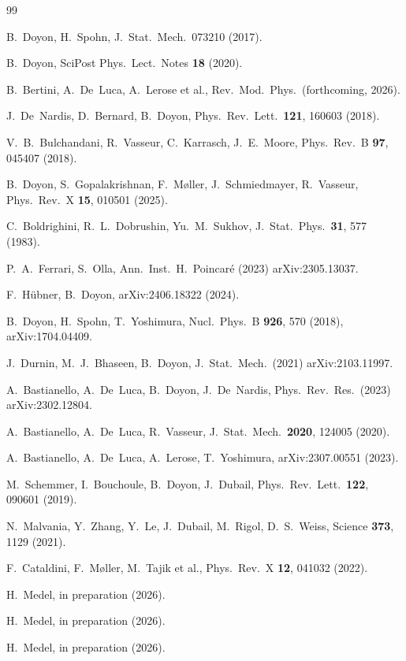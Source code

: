 \documentclass[aps,pre,twocolumn,superscriptaddress,longbibliography,floatfix]{revtex4-2}
\begin{document}
\begin{thebibliography}{99}

B.~Doyon, H.~Spohn,
J.~Stat.~Mech.\ 073210 (2017).

B.~Doyon,
SciPost Phys.\ Lect.\ Notes \textbf{18} (2020).

B.~Bertini, A.~De~Luca, A.~Lerose et al.,
Rev.~Mod.~Phys.\ (forthcoming, 2026).

J.~De~Nardis, D.~Bernard, B.~Doyon,
Phys.~Rev.~Lett.\ \textbf{121}, 160603 (2018).

V.~B.~Bulchandani, R.~Vasseur, C.~Karrasch, J.~E.~Moore,
Phys.~Rev.~B \textbf{97}, 045407 (2018).

B.~Doyon, S.~Gopalakrishnan, F.~M{\o}ller,
J.~Schmiedmayer, R.~Vasseur,
Phys.~Rev.~X \textbf{15}, 010501 (2025).

C.~Boldrighini, R.~L.~Dobrushin, Yu.~M.~Sukhov,
J.~Stat.~Phys.\ \textbf{31}, 577 (1983).

P.~A.~Ferrari, S.~Olla,
Ann.~Inst.~H.~Poincar\'e (2023) arXiv:2305.13037.

F.~H\"ubner, B.~Doyon,
arXiv:2406.18322 (2024).

B.~Doyon, H.~Spohn, T.~Yoshimura,
Nucl.~Phys.~B \textbf{926}, 570 (2018), arXiv:1704.04409.

J.~Durnin, M.~J.~Bhaseen, B.~Doyon,
J.~Stat.~Mech.\ (2021) arXiv:2103.11997.

A.~Bastianello, A.~De~Luca, B.~Doyon, J.~De~Nardis,
Phys.~Rev.~Res.\ (2023) arXiv:2302.12804.

A.~Bastianello, A.~De~Luca, R.~Vasseur,
J.~Stat.~Mech.\ \textbf{2020}, 124005 (2020).

A.~Bastianello, A.~De~Luca, A.~Lerose, T.~Yoshimura,
arXiv:2307.00551 (2023).

M.~Schemmer, I.~Bouchoule, B.~Doyon, J.~Dubail,
Phys.~Rev.~Lett.\ \textbf{122}, 090601 (2019).

N.~Malvania, Y.~Zhang, Y.~Le, J.~Dubail, M.~Rigol, D.~S.~Weiss,
Science \textbf{373}, 1129 (2021).

F.~Cataldini, F.~M{\o}ller, M.~Tajik et al.,
Phys.~Rev.~X \textbf{12}, 041032 (2022).

H.~Medel,
in preparation (2026).

H.~Medel,
in preparation (2026).

H.~Medel,
in preparation (2026).

\end{thebibliography}
\end{document}

